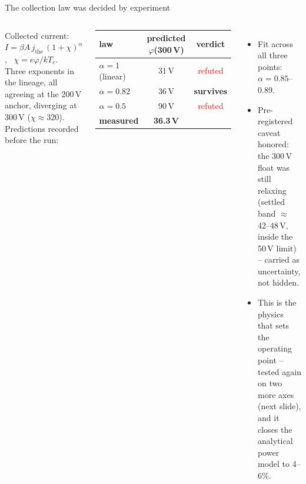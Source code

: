 \documentclass[10pt,aspectratio=169]{beamer}
\begin{document}
\begin{frame}{The collection law was decided by experiment}
  \begin{columns}
      \small
      Collected current: $I = \beta A\, j_{\mathrm{the}}\,(1+\chi)^{\alpha}$,
      \ $\chi = e\varphi/kT_e$.\\[1ex]
      Three exponents in the lineage, all agreeing at the 200\,V anchor,
      diverging at 300\,V ($\chi \approx 320$). Predictions recorded before
      the run:
      \begin{center}
      \begin{tabular}{lcc}
        \toprule
        law & predicted $\varphi$(300\,V) & verdict \\
        \midrule
        $\alpha = 1$ (linear) & 31\,V & \textcolor{red}{refuted} \\
        $\alpha = 0.82$ & 36\,V & \textcolor{green!50!black}{\textbf{survives}} \\
        $\alpha = 0.5$ & 90\,V & \textcolor{red}{refuted} \\
        \midrule
        \textbf{measured} & \textbf{36.3\,V} & \\
        \bottomrule
      \end{tabular}
      \end{center}
      \small
      \begin{itemize}
        \item Fit across all three points: $\alpha = 0.85$--0.89.
        \item Pre-registered caveat honored: the 300\,V float was still
              relaxing (settled band $\approx$42--48\,V, inside the 50\,V
              limit) -- carried as uncertainty, not hidden.
        \item This is the physics that sets the operating point -- tested
              again on two more axes (next slide), and it closes the
              analytical power model to 4--6\%.
      \end{itemize}
  \end{columns}
\end{frame}
\end{document}
